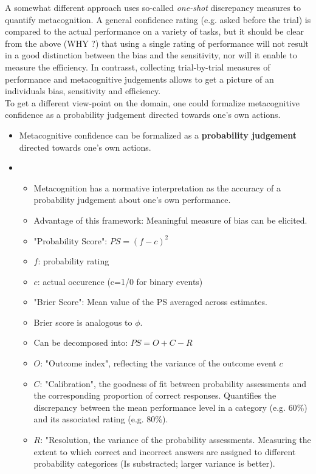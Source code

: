 \documentclass[../main/main.tex]{subfiles}
\begin{document}
	A somewhat different approach uses so-called \textit{one-shot} discrepancy measures to quantify metacognition. A general confidence rating (e.g. asked before the trial) is compared to the actual performance on a variety of tasks, but it should be clear from the above (WHY ?) that using a single rating of performance will not result in a good distinction between the bias and the sensitivity, nor will it enable to measure the efficiency. In contrasst, collecting trial-by-trial measures of performance and metacognitive judgements allows to get a picture of an individuals bias, sensitivity and efficiency.\\
	To get a different view-point on the domain, one could formalize metacognitive confidence as a probability judgement directed towards one's own actions.
	\\
\begin{itemize}

	\item Metacognitive confidence can be formalized as a \textbf{probability judgement} directed towards one's own actions.
	\item [] \begin{itemize}
			\item Metacognition has a normative interpretation as the accuracy of a probability judgement about one's own performance.
			\item Advantage of this framework: Meaningful measure of bias can be elicited.
			\item "Probability Score": $PS = (f - c)^2$
			\item $f$: probability rating
			\item $c$: actual occurence (c=1/0 for binary events)
			\item "Brier Score": Mean value of the PS averaged across estimates.
			\item Brier score is analogous to $\phi$.
			\item Can be decomposed into: $PS = O + C -R$
			\item $O$: "Outcome index", reflecting the variance of the outcome event $c$
			\item $C$: "Calibration", the goodness of fit between probability assessments and the corresponding proportion of correct responses. Quantifies the discrepancy between the mean performance level in a category (e.g. $60\%$) and its associated rating (e.g. $80\%$).
			\item $R$: "Resolution, the variance of the probability assessments. Measuring the extent to which correct and incorrect answers are assigned to different probability categorices (Is substracted; larger variance is better).
		\end{itemize}
	
\end{itemize}
\end{document}
